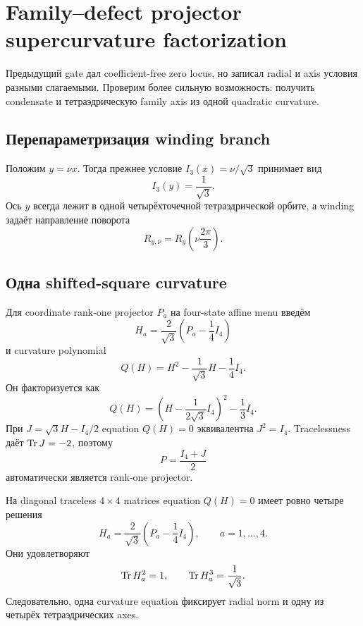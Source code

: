 \chapter{Family--defect projector supercurvature factorization}

Предыдущий gate дал coefficient-free zero locus, но записал radial и axis
условия разными слагаемыми. Проверим более сильную возможность: получить
condensate и тетраэдрическую family axis из одной quadratic curvature.

\section{Перепараметризация winding branch}

Положим \(y=\nu x\). Тогда прежнее условие
\(I_3(x)=\nu/\sqrt3\) принимает вид
\begin{equation}
 I_3(y)=\frac1{\sqrt3}.
\end{equation}
Ось \(y\) всегда лежит в одной четырёхточечной тетраэдрической орбите,
а winding задаёт направление поворота
\begin{equation}
 R_{y,\nu}=R_y\!\left(\nu\frac{2\pi}{3}\right).
\end{equation}

\section{Одна shifted-square curvature}

Для coordinate rank-one projector \(P_a\) на four-state affine menu
введём
\begin{equation}
 H_a=\frac2{\sqrt3}\left(P_a-\frac14I_4\right)
\end{equation}
и curvature polynomial
\begin{equation}
 Q(H)=H^2-\frac1{\sqrt3}H-\frac14I_4.
 \label{eq:projector-supercurvature}
\end{equation}
Он факторизуется как
\begin{equation}
 Q(H)=\left(H-\frac1{2\sqrt3}I_4\right)^2-\frac13I_4.
\end{equation}
При \(J=\sqrt3H-I_4/2\) equation \(Q(H)=0\) эквивалентна
\(J^2=I_4\). Tracelessness даёт \(\operatorname{Tr} J=-2\), поэтому
\begin{equation}
 P=\frac{I_4+J}{2}
\end{equation}
автоматически является rank-one projector.

\begin{theorem}
На diagonal traceless \(4\times4\) matrices equation \(Q(H)=0\)
имеет ровно четыре решения
\begin{equation}
 H_a=\frac2{\sqrt3}\left(P_a-\frac14I_4\right),
 \qquad a=1,\ldots,4.
\end{equation}
Они удовлетворяют
\begin{equation}
 \operatorname{Tr} H_a^2=1,
 \qquad
 \operatorname{Tr} H_a^3=\frac1{\sqrt3}.
\end{equation}
Следовательно, одна curvature equation фиксирует radial norm и одну из
четырёх тетраэдрических axes.
\end{theorem}

